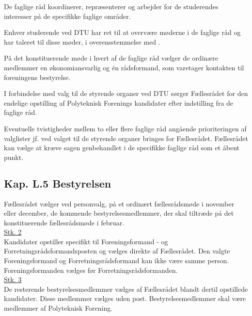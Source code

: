 \begin{list}
\item De faglige råd koordinerer, repræsenterer og arbejder for de studerendes interesser på de specifikke faglige områder.\\

\item Enhver studerende ved DTU har ret til at overvære møderne i de faglige råd og har taleret til disse møder, i overensstemmelse med .\\

\item På det konstituerende møde i hvert af de faglige råd vælger de ordinære medlemmer en økonomiansvarlig og én rådsformand, som varetager kontakten til foreningens bestyrelse.\\

\item \label{L:faglige:DTUvalg} I forbindelse med valg til de styrende organer ved DTU sørger Fællesrådet for den endelige opstilling af Polyteknisk Forenings kandidater efter indstilling fra de faglige råd.\\

\item Eventuelle tvistigheder mellem to eller flere faglige råd angående prioriteringen af valglister jf.  ved valget til de styrende organer bringes for Fællesrådet. Fællesrådet kan vælge at kræve sagen genbehandlet i de specifikke faglige råd som et åbent punkt.\\

\subsection*{Kap. L.5 Bestyrelsen}
\label{L:kap:bestyrelsen}
\item \label{L:best:valg} Fællesrådet vælger ved personvalg, på et ordinært fællesrådsmøde i november eller december, de kommende bestyrelsesmedlemmer, der skal tiltræde på det konstituerende fællesrådsmøde i februar.\\

\underline{Stk. 2}\\
Kandidater opstiller specifikt til Foreningsformand - og Forretningsrådsformandsposten og vælges direkte af Fællesrådet. Den valgte Foreningsformand og Forretningsrådsformand kan ikke være samme person. Foreningsformanden vælges før Forretningsrådsformanden.\\

\underline{Stk. 3}\\
De resterende bestyrelsesmedlemmer vælges af Fællesrådet blandt dertil opstillede kandidater. Disse medlemmer vælges uden post. Bestyrelsesmedlemmer skal være medlemmer af Polyteknisk Forening.\\


\end{list}
